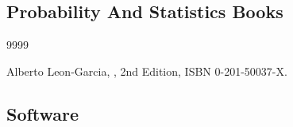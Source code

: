 
\subsection*{Probability And Statistics Books}


\begin{thecustombibliography}{9999}


Alberto Leon-Garcia,
,
2nd Edition,
ISBN 0-201-50037-X.

\end{thecustombibliography}



\subsection*{Software}


